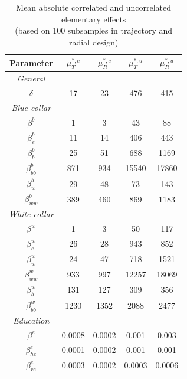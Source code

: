 \newpage
\setlength{\tabcolsep}{22pt} %
\begin{table}[H] 
	\centering
	\begin{threeparttable}
		\caption[Model Parametrization]{Mean absolute correlated and uncorrelated elementary effects\\ (based on 100 subsamples in trajectory and radial design)}
		\label{tab:devees}
		\renewcommand{\arraystretch}{1.2}%
		\begin{tabular}{cS[table-format=3.2]S[table-format=3.2]@{\hskip 0.7in}|@{\hskip 0.5in}S[table-format=3.2]S[table-format=3.2]}
			
			{Parameter}     & {$\mu^{*,c}_T$}   & {$\mu^{*,c}_R$} & {$\mu^{*,u}_T$} & {$\mu^{*,u}_R$}\\ \midrule
			\textit{General} \\
			$\delta$ & 17   & 23 & 476 & 415   \\    \midrule
			\textit{Blue-collar}\\    
			$\beta^b$ & 1   & 3            & 43 & 88    \\
			$\beta_e^b$ & 11  &    14        & 406  & 443    \\
			$\beta^b_b$ & 25  & 51            & 688  & 1169    \\
			$\beta^b_{bb}$ & 871 & 934           & 15540  & 17860     \\
			$\beta^b_w$ & 29    & 48             & 73  &  143  \\
			$\beta^b_{ww}$ & 389    & 460           & 869 &  1183    \\ \midrule
			\textit{White-collar}\\
			$\beta^w$ & 1   & 3            & 50 &  117   \\
			$\beta^w_e$ & 26   & 28          & 943 &  852    \\
			$\beta^w_w$ & 24  & 47            & 718 &  1521   \\
			$\beta^w_{ww}$ & 933  & 997           & 12257 & 18069   \\
			$\beta^w_b$ & 131 & 127           & 309 &  356   \\
			$\beta^w_{bb}$ & 1230 & 1352         & 2088 &  2477   \\ \midrule
			\textit{Education} \\
			$\beta^e$     & 0.0008    & 0.0002              & 0.001&  0.003   \\
			$\beta_{he}^e$     & 0.0001    & 0.0002              & 0.001  & 0.001    \\
			$\beta_{re}^e$     & 0.0003   & 0.0002               & 0.0003  &   0.0006  \\ \midrule

\end{tabular}
\end{threeparttable}
\end{table}
